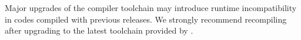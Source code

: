 \begin{center}
\begin{tcolorbox}[]
\small Major upgrades of the \GNU{} compiler toolchain may introduce runtime 
incompatibility in codes compiled with previous releases. We strongly recommend
recompiling after upgrading to the latest toolchain provided by \OHPC{}.
\end{tcolorbox}
\end{center}
